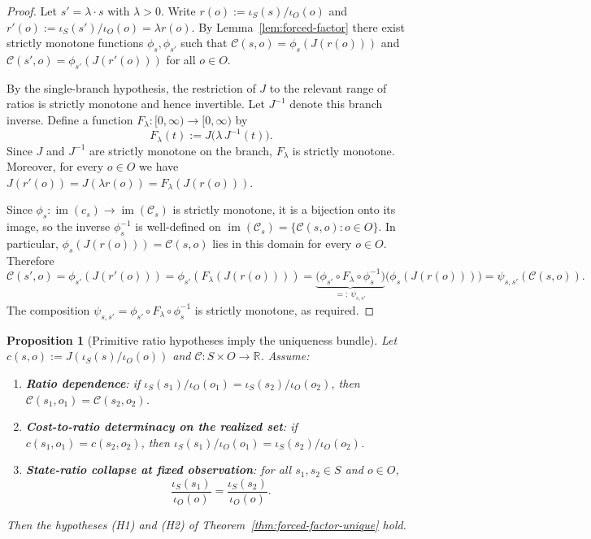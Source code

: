 \documentclass[11pt,reqno]{amsart}
\newtheorem{proposition}[theorem]{Proposition}
\theoremstyle{definition}
\theoremstyle{remark}
\newcommand{\R}{\mathbb{R}}
\newcommand{\1}{\mathbf{1}}
\begin{document}
\begin{proof}
Let $s'=\lambda\cdot s$ with $\lambda>0$. Write $r(o):=\iota_S(s)/\iota_O(o)$ and $r'(o):=\iota_S(s')/\iota_O(o)=\lambda r(o)$.
By Lemma~\ref{lem:forced-factor} there exist strictly monotone functions $\phi_s,\phi_{s'}$ such that
$\mathcal{C}(s,o)=\phi_s(J(r(o)))$ and $\mathcal{C}(s',o)=\phi_{s'}(J(r'(o)))$ for all $o\in O$.

By the single-branch hypothesis, the restriction of $J$ to the relevant range of ratios is strictly monotone and hence invertible.
Let $J^{-1}$ denote this branch inverse.
Define a function $F_\lambda:[0,\infty)\to[0,\infty)$ by
\[
F_\lambda(t):=J\!\bigl(\lambda\,J^{-1}(t)\bigr).
\]
Since $J$ and $J^{-1}$ are strictly monotone on the branch, $F_\lambda$ is strictly monotone. Moreover,
for every $o\in O$ we have $J(r'(o))=J(\lambda r(o))=F_\lambda(J(r(o)))$.

Since $\phi_s:\operatorname{im}(c_s)\to \operatorname{im}(\mathcal C_s)$ is strictly monotone, it is a bijection onto its image, so the inverse $\phi_s^{-1}$ is well-defined on $\operatorname{im}(\mathcal C_s)=\{\mathcal C(s,o):o\in O\}$. In particular, $\phi_s(J(r(o)))=\mathcal C(s,o)$ lies in this domain for every $o\in O$.
Therefore
\[
\mathcal{C}(s',o)=\phi_{s'}(J(r'(o)))=\phi_{s'}(F_\lambda(J(r(o))))
=\underbrace{\bigl(\phi_{s'}\circ F_\lambda\circ \phi_s^{-1}\bigr)}_{=:~\psi_{s,s'}}\bigl(\phi_s(J(r(o)))\bigr)
=\psi_{s,s'}(\mathcal{C}(s,o)).
\]
The composition $\psi_{s,s'}=\phi_{s'}\circ F_\lambda\circ \phi_s^{-1}$ is strictly monotone, as required.
\end{proof}


\begin{proposition}[Primitive ratio hypotheses imply the uniqueness bundle]\label{prop:primitive-to-H}
Let $c(s,o):=J(\iota_S(s)/\iota_O(o))$ and $\mathcal C:S\times O\to\R$.
Assume:
\begin{enumerate}[label=\textup{(P\arabic*)},leftmargin=2.2em]
\item \textbf{Ratio dependence}: if
$\iota_S(s_1)/\iota_O(o_1)=\iota_S(s_2)/\iota_O(o_2)$, then
$\mathcal C(s_1,o_1)=\mathcal C(s_2,o_2)$.
\item \textbf{Cost-to-ratio determinacy on the realized set}: if
$c(s_1,o_1)=c(s_2,o_2)$, then
$\iota_S(s_1)/\iota_O(o_1)=\iota_S(s_2)/\iota_O(o_2)$.
\item \textbf{State-ratio collapse at fixed observation}: for all $s_1,s_2\in S$ and $o\in O$,
\[
\frac{\iota_S(s_1)}{\iota_O(o)}=\frac{\iota_S(s_2)}{\iota_O(o)}.
\]
\end{enumerate}
Then the hypotheses (H1) and (H2) of Theorem~\ref{thm:forced-factor-unique} hold.
\end{proposition}
\end{document}
